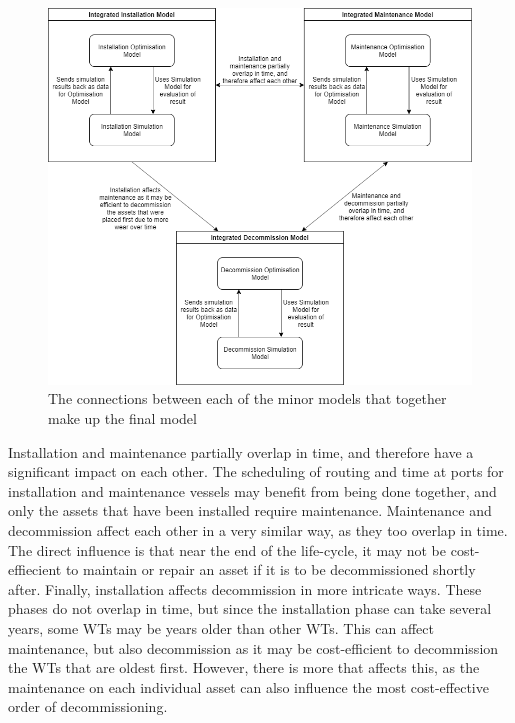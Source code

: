 \documentclass[a4paper,12pt]{article}
\begin{document}
\begin{figure}[h]
\includegraphics[width = \textwidth]{OWF Tool interactions}
\caption{The connections between each of the minor models that together make up the final model}
\label{f:interact}
\end{figure}

Installation and maintenance partially overlap in time, and therefore have a significant impact on each other. The scheduling of routing and time at ports for installation and maintenance vessels may benefit from being done together, and only the assets that have been installed require maintenance. Maintenance and decommission affect each other in a very similar way, as they too overlap in time. The direct influence is that near the end of the life-cycle, it may not be cost-effiecient to maintain or repair an asset if it is to be decommissioned shortly after. Finally, installation affects decommission in more intricate ways. These phases do not overlap in time, but since the installation phase can take several years, some WTs may be years older than other WTs. This can affect maintenance, but also decommission as it may be cost-efficient to decommission the WTs that are oldest first. However, there is more that affects this, as the maintenance on each individual asset can also influence the most cost-effective order of decommissioning. 

\bigskip
\end{document}
